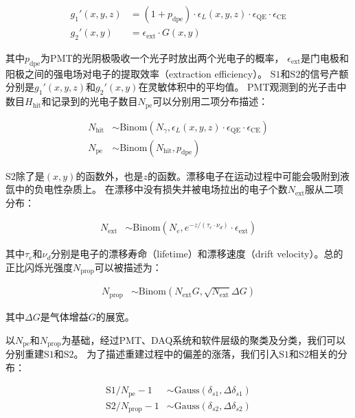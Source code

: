 \begin{align}
    \label{eq:g12p}
    g_1'(x,y,z) &= (1+p_{\mathrm{dpe}})\cdot\epsilon_L(x,y,z)\cdot\epsilon_{\mathrm{QE}}\cdot\epsilon_{\mathrm{CE}} \\
    g_2'(x,y) &= \epsilon_{\mathrm{ext}}\cdot G(x,y)
\end{align}

其中$p_{\mathrm{dpe}}$为PMT的光阴极吸收一个光子时放出两个光电子的概率\cite{arazi_first_2015,paredes_response_2018}，
$\epsilon_{\mathrm{ext}}$是门电极和阳极之间的强电场对电子的提取效率（extraction efficiency）。
$\mathrm{S1}$和$\mathrm{S2}$的信号产额分别是$g_1'(x,y,z)$和$g_2'(x,y)$在灵敏体积中的平均值。
PMT观测到的光子击中数目$H_{\mathrm{hit}}$和记录到的光电子数目$N_{\mathrm{pe}}$可以分别用二项分布描述：

\begin{align}
    \label{eq:N_hitpe}
    N_{\mathrm{hit}} &\sim \mathrm{Binom}\left(N_\gamma,\epsilon_L(x,y,z)\cdot\epsilon_{\mathrm{QE}}\cdot\epsilon_{\mathrm{CE}}\right) \\
    N_{\mathrm{pe}} &\sim \mathrm{Binom}\left(N_{\mathrm{hit}},p_{\mathrm{dpe}}\right)
\end{align}

$\mathrm{S2}$除了是$(x,y)$的函数外，也是$z$的函数。漂移电子在运动过程中可能会吸附到液氙中的负电性杂质上。
在漂移中没有损失并被电场拉出的电子个数$N_{\mathrm{ext}}$服从二项分布：

\begin{align}
    \label{eq:N_ext}
    N_{\mathrm{ext}} &\sim \mathrm{Binom}\left(N_e,e^{-z/(\tau_e\cdot\nu_d)}\cdot\epsilon_{\mathrm{ext}}\right)
\end{align}

其中$\tau_e$和$\nu_d$分别是电子的漂移寿命（lifetime）和漂移速度（drift velocity）。总的正比闪烁光强度$N_{\mathrm{prop}}$可以被描述为：

\begin{align}
    \label{eq:N_prop}
    N_{\mathrm{prop}} &\sim \mathrm{Binom}\left(N_{\mathrm{ext}}G,\sqrt{N_{\mathrm{ext}}}\Delta G\right)
\end{align}

其中$\Delta G$是气体增益$G$的展宽。

以$N_{\mathrm{pe}}$和$N_{\mathrm{prop}}$为基础，经过PMT、DAQ系统和软件层级的聚类及分类，我们可以分别重建$\mathrm{S1}$和$\mathrm{S2}$。
为了描述重建过程中的偏差的涨落，我们引入$\mathrm{S1}$和$\mathrm{S2}$相关的分布：

\begin{align}
    \label{eq:s1s2}
    \mathrm{S1}/N_{\mathrm{pe}}-1 &\sim \mathrm{Gauss}\left(\delta_{s1},\Delta \delta_{s1}\right) \\
    \mathrm{S2}/N_{\mathrm{prop}}-1 &\sim \mathrm{Gauss}\left(\delta_{s2},\Delta \delta_{s2}\right)
\end{align}

